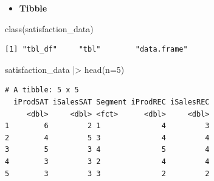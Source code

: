 \documentclass[
  ignorenonframetext,
]{beamer}
\newenvironment{Shaded}{\begin{snugshade}}{\end{snugshade}}
\newcommand{\AttributeTok}[1]{\textcolor[rgb]{0.40,0.45,0.13}{#1}}
\newcommand{\DecValTok}[1]{\textcolor[rgb]{0.68,0.00,0.00}{#1}}
\newcommand{\FunctionTok}[1]{\textcolor[rgb]{0.28,0.35,0.67}{#1}}
\newcommand{\NormalTok}[1]{\textcolor[rgb]{0.00,0.23,0.31}{#1}}
\newcommand{\SpecialCharTok}[1]{\textcolor[rgb]{0.37,0.37,0.37}{#1}}
\providecommand{\tightlist}{%
  \setlength{\itemsep}{0pt}\setlength{\parskip}{0pt}}\usepackage{longtable,booktabs,array}
\begin{document}
\begin{frame}[fragile]{}
\label{section-11}
\begin{itemize}
\tightlist
\item
  \textbf{Tibble}
\end{itemize}

\tiny

\begin{Shaded}
\begin{Highlighting}[]
\FunctionTok{class}\NormalTok{(satisfaction\_data)}
\end{Highlighting}
\end{Shaded}

\begin{verbatim}
[1] "tbl_df"     "tbl"        "data.frame"
\end{verbatim}

\begin{Shaded}
\begin{Highlighting}[]
\NormalTok{satisfaction\_data }\SpecialCharTok{|\textgreater{}} \FunctionTok{head}\NormalTok{(}\AttributeTok{n=}\DecValTok{5}\NormalTok{)}
\end{Highlighting}
\end{Shaded}

\begin{verbatim}
# A tibble: 5 x 5
  iProdSAT iSalesSAT Segment iProdREC iSalesREC
     <dbl>     <dbl> <fct>      <dbl>     <dbl>
1        6         2 1              4         3
2        4         5 3              4         4
3        5         3 4              5         4
4        3         3 2              4         4
5        3         3 3              2         2
\end{verbatim}
\end{frame}
\end{document}
